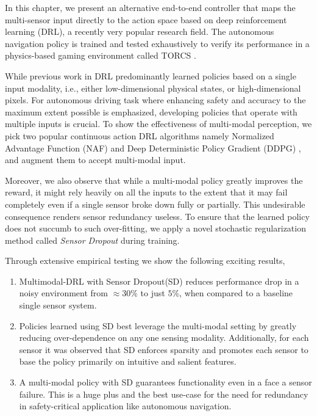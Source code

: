 \documentclass[../thesis.tex]{subfiles}
\begin{document}
In this chapter, we present an alternative end-to-end controller that maps the multi-sensor input directly to the action space based on deep reinforcement learning (DRL), a recently very popular research field. The autonomous navigation policy is trained and tested exhaustively to verify its performance in a physics-based gaming environment called TORCS \cite{wymann2000torcs}. 

While previous work in DRL predominantly learned policies based on a single input modality, i.e., either low-dimensional physical states, or high-dimensional pixels. For autonomous driving task where enhancing safety and accuracy to the maximum extent possible is emphasized, developing policies that operate with multiple inputs is crucial. To show the effectiveness of multi-modal perception, we pick two popular continuous action DRL algorithms namely Normalized Advantage Function (NAF) \cite{CDQN} and Deep Deterministic Policy Gradient (DDPG) \cite{DBLP:journals/corr/LillicrapHPHETS15}, and augment them to accept multi-modal input.

Moreover, we also observe that while a multi-modal policy greatly improves the reward, it might rely heavily on all the inputs to the extent that it may fail completely even if a single sensor broke down fully or partially. This undesirable consequence renders sensor redundancy useless. To ensure that the learned policy does not succumb to such over-fitting, we apply a novel stochastic regularization method called \emph{Sensor Dropout} during training. 

Through extensive empirical testing we show the following exciting results,
\begin{enumerate}

	\item Multimodal-DRL with Sensor Dropout(SD) reduces performance drop in a noisy environment from $\approx 30\%$ to just $5\%$, when compared to a baseline single sensor system.
	
	\item Policies learned using SD best leverage the multi-modal setting by greatly reducing over-dependence on any one sensing modality. Additionally, for each sensor it was observed that SD enforces sparsity and promotes each sensor to base the policy primarily on intuitive and salient features.
	
	\item A multi-modal policy with SD guarantees functionality even in a face a sensor failure. This is a huge plus and the best use-case for the need for redundancy in safety-critical application like autonomous navigation.

\end{enumerate}
\end{document}
